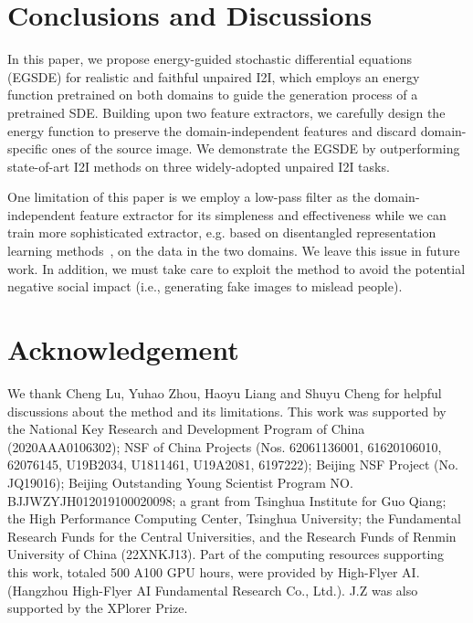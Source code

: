 \documentclass{article}
\begin{document}
\section{Conclusions and Discussions}
\label{sec:conclusion}
In this paper, we propose energy-guided stochastic differential equations (EGSDE) for realistic and faithful unpaired I2I, which employs an energy function pretrained on both domains to guide the generation process of a pretrained SDE. Building upon two feature extractors, we carefully design the energy function to preserve the domain-independent features and discard domain-specific ones of the source image. We demonstrate the EGSDE by outperforming state-of-art I2I methods on three widely-adopted unpaired I2I tasks.

One limitation of this paper is we employ a low-pass filter as the domain-independent feature extractor for its simpleness and effectiveness while we can train more sophisticated extractor, e.g. based on disentangled representation learning methods~\cite{sanchez2020learning,chen2016infogan,higgins2016beta,kim2018disentangling,liu2018unified}, on the data in the two domains. We leave this issue in future work. In addition, we must take care to exploit the method to avoid the potential negative social impact (i.e., generating fake images to mislead people). 


\section*{Acknowledgement}

We thank Cheng Lu, Yuhao Zhou, Haoyu Liang and Shuyu Cheng for helpful discussions about the method and its limitations.
This work was supported by the National Key Research and Development Program of China (2020AAA0106302); NSF of China Projects (Nos. 62061136001, 61620106010, 62076145, U19B2034, U1811461, U19A2081, 6197222); Beijing NSF Project (No. JQ19016); Beijing Outstanding Young Scientist Program NO. BJJWZYJH012019100020098; a grant from Tsinghua Institute for Guo Qiang; the High Performance Computing Center, Tsinghua University; the Fundamental Research Funds for the Central Universities, and the Research Funds of Renmin University of China (22XNKJ13).
Part of the computing resources supporting this work, totaled 500 A100 GPU hours, were provided by High-Flyer AI. (Hangzhou High-Flyer AI Fundamental Research Co., Ltd.). J.Z was also supported by the XPlorer Prize.






\end{document}
